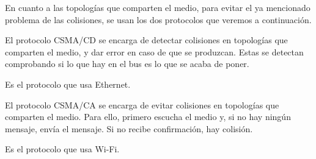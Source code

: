 
En cuanto a las topologías que comparten el medio, para evitar el ya mencionado problema de las colisiones, se usan los dos protocolos que veremos a continuación.
\begin{definicion}[CSMA/CD]
    El protocolo \acrfull{CSMA/CD} se encarga de detectar colisiones en topologías que comparten el medio, y dar error en caso de que se produzcan. Estas se detectan comprobando si lo que hay en el bus es lo que se acaba de poner.

    Es el protocolo que usa Ethernet.
\end{definicion}

\begin{definicion}[CSMA/CA]
    El protocolo \acrfull{CSMA/CA} se encarga de evitar colisiones en topologías que comparten el medio. Para ello, primero escucha el medio y, si no hay ningún mensaje, envía el mensaje. Si no recibe confirmación, hay colisión.

    Es el protocolo que usa Wi-Fi.
\end{definicion}


